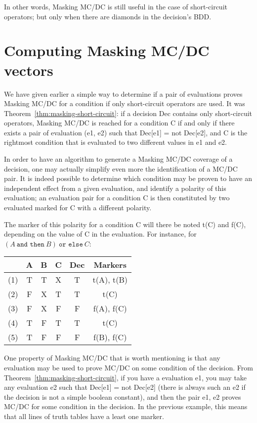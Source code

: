\documentclass[a4paper,12pt,twoside]{article}
\newcommand{\andthen}{\texttt{and then}}
\newcommand{\orelse}{\texttt{or else}}
\begin{document}
In other words, Masking MC/DC is still useful in the case of
short-circuit operators; but only when there are diamonds in the
decision's BDD.

\section{Computing Masking MC/DC vectors}

We have given earlier a simple way to determine if a pair of
evaluations proves Masking MC/DC for a condition if only short-circuit
operators are used. It was Theorem~\ref{thm:masking-short-circuit}: if
a decision Dec contains only short-circuit operators, Masking MC/DC is
reached for a condition C if and only if there exists a pair of
evaluation (e1, e2) such that Dec[e1] = not Dec[e2], and C is the
rightmost condition that is evaluated to two different values in e1
and e2.

In order to have an algorithm to generate a Masking MC/DC coverage of
a decision, one may actually simplify even more the identification of
a MC/DC pair. It is indeed possible to determine which condition may
be proven to have an independent effect from a given evaluation, and
identify a polarity of this evaluation; an evaluation pair for a
condition C is then constituted by two evaluated marked for C with a
different polarity.

The marker of this polarity for a condition C will there be noted t(C)
and f(C), depending on the value of C in the evaluation. For instance,
for $(A \ \andthen{} \ B) \ \orelse{} \ C$:

\begin{center}
\begin{tabular}{|c|c|c|c||c||c|}
\hline
    & A & B & C & Dec & Markers   \\ \hline
(1) & T & T & X & T   & t(A), t(B)\\ \hline
(2) & F & X & T & T   & t(C)      \\ \hline
(3) & F & X & F & F   & f(A), f(C)\\ \hline
(4) & T & F & T & T   & t(C)      \\ \hline
(5) & T & F & F & F   & f(B), f(C)\\ \hline
\end{tabular}
\end{center}

One property of Masking MC/DC that is worth mentioning is that any
evaluation may be used to prove MC/DC on some condition of the
decision. From Theorem~\ref{thm:masking-short-circuit}, if you have a
evaluation e1, you may take any evaluation e2 such that Dec[e1] = not
Dec[e2] (there is always such an e2 if the decision is not a simple
boolean constant), and then the pair {e1, e2} proves MC/DC for some
condition in the decision. In the previous example, this means that
all lines of truth tables have a least one marker.
\end{document}
